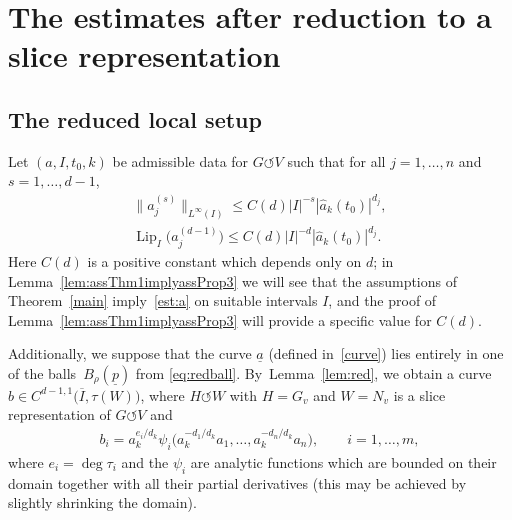 \documentclass[11pt]{article}
\numberwithin{equation}{section}
\numberwithin{equation}{section}
\def\rh{\rho}
\def\ta{\tau}
\def\ps{\psi}
\def\ol{\overline}
\def\Lip{\on{Lip}}
\def\we{\hat}
\def\acts{\circlearrowleft}
\let\on=\operatorname
\begin{document}
\section{The estimates after reduction to a slice representation} %



\subsection{The reduced local setup}

Let $(a, I, t_0, k)$ be admissible data for $G \acts V$ such that
for all
$j = 1,\dots,n$ and $ s = 1,\dots,d-1$,
 \begin{gather}%
 \big\|a_j^{(s)} \big\|_{L^\infty(I)} \le C(d) |I|^{-s} |\we a_k (t_0)|^{d_j},\nonumber
 \\
 \Lip_I \big(a_j^{(d-1)}\big) \le C(d) |I|^{-d} |\we a_k (t_0)|^{d_j}.
\label{est:a}
 \end{gather}
Here $C(d)$ is a positive constant which depends only on $d$; in
Lemma~\ref{lem:assThm1implyassProp3} we will see that the assumptions of Theorem~\ref{main}
imply~\eqref{est:a} on suitable intervals $I$, and the proof of Lemma~\ref{lem:assThm1implyassProp3}
will provide a specific value for $C(d)$.

Additionally,
we suppose that the curve $\underline a$ (defined in~\eqref{curve}) lies entirely in one of the balls~$B_\rh(\underline p)$ from
\eqref{eq:redball}. By~Lemma~\ref{lem:red}, we obtain a curve $b \in C^{d-1,1}\big(\ol I,\ta(W)\big)$, where $H \acts W$ with $H=G_v$ and $W=N_v$ is a
slice representation of $G \acts V$ and
\begin{gather} \label{eq:b_i}
 b_i = a_k^{e_i/d_k} \ps_i \big(a_k^{-d_1/d_k} a_1, \dots, a_k^{-d_n/d_k} a_n\big), \qquad i = 1,\dots,m,
\end{gather}
 where $e_i = \deg \ta_i$ and the $\ps_i$ are analytic functions which are bounded on their domain together with all
 their partial derivatives (this may be achieved by slightly shrinking the domain).
\end{document}
